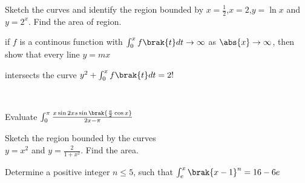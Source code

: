 \iffalse


\title{Subjective questions}
\section{subjective}
\author{AI24BTECH11018 - Sreya}
\fi


\item Sketch the curves and identify the region bounded by $x=\frac{1}{2}$,$x=2$,$y=\ln{x}$ and $y=2^x$. Find the area of region.

\hfill{}

\item if $f$ is a continous function with $\int_{0}^{x}f\brak{t}dt\rightarrow\infty$ as $\abs{x}\rightarrow\infty$, then show that every line $y=mx$\\

intersects the curve $y^2+\int_{0}^{x}f\brak{t}dt=2!$

\hfill{}\\

\item Evaluate $\int_{0}^{\pi}\frac{x\sin 2xs\sin \brak{\frac{\pi}{2}\cos x}}{2x-\pi}$

\hfill{}

\item  Sketch the region bounded by the curves\\ $y=x^2$ and
$y=\frac{2}{1+x^2}$. Find the area.


\hfill{}

\item  Determine a positive integer $n\leq 5$, such that $\int_e^x\brak{x-1}^n=16-6e$

